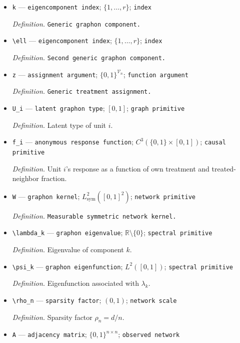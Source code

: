 \documentclass{article}
\begin{document}
\begin{itemize}
  \item \texttt{k} --- \texttt{eigencomponent index}; \(\{1,\ldots,r\}\); \texttt{index}
  \par\smallskip\noindent\emph{Definition.} \texttt{Generic graphon component.}
  \item \texttt{\textbackslash{}\allowbreak{}ell} --- \texttt{eigencomponent index}; \(\{1,\ldots,r\}\); \texttt{index}
  \par\smallskip\noindent\emph{Definition.} \texttt{Second generic graphon component.}
  \item \texttt{z} --- \texttt{assignment argument}; \(\{0,1\}^{\mathcal V_n}\); \texttt{function argument}
  \par\smallskip\noindent\emph{Definition.} \texttt{Generic treatment assignment.}
  \item \texttt{U\_\allowbreak{}i} --- \texttt{latent graphon type}; \([0,1]\); \texttt{graph primitive}
  \par\smallskip\noindent\emph{Definition.} Latent type of unit \(i\).
  \item \texttt{f\_\allowbreak{}i} --- \texttt{anonymous response function}; \(C^3(\{0,1\}\times[0,1])\); \texttt{causal primitive}
  \par\smallskip\noindent\emph{Definition.} Unit \(i\)'s response as a function of own treatment and treated-neighbor fraction.
  \item \texttt{W} --- \texttt{graphon kernel}; \(L^2_{\mathrm{sym}}([0,1]^2)\); \texttt{network primitive}
  \par\smallskip\noindent\emph{Definition.} \texttt{Measurable symmetric network kernel.}
  \item \texttt{\textbackslash{}\allowbreak{}lambda\_\allowbreak{}k} --- \texttt{graphon eigenvalue}; \(\mathbb R\setminus\{0\}\); \texttt{spectral primitive}
  \par\smallskip\noindent\emph{Definition.} Eigenvalue of component \(k\).
  \item \texttt{\textbackslash{}\allowbreak{}psi\_\allowbreak{}k} --- \texttt{graphon eigenfunction}; \(L^2([0,1])\); \texttt{spectral primitive}
  \par\smallskip\noindent\emph{Definition.} Eigenfunction associated with \(\lambda_k\).
  \item \texttt{\textbackslash{}\allowbreak{}rho\_\allowbreak{}n} --- \texttt{sparsity factor}; \((0,1)\); \texttt{network scale}
  \par\smallskip\noindent\emph{Definition.} Sparsity factor \(\rho_n=d/n\).
  \item \texttt{A} --- \texttt{adjacency matrix}; \(\{0,1\}^{n\times n}\); \texttt{observed network}

\end{itemize}
\end{document}
